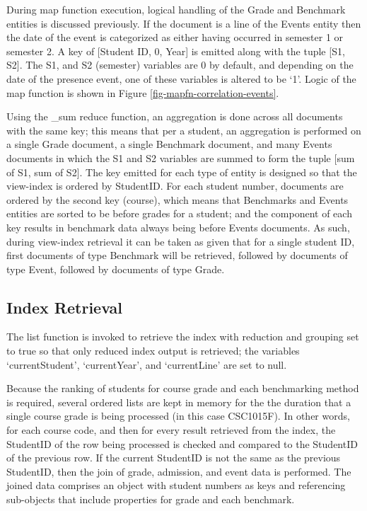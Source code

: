 During map function execution, logical handling of the Grade and Benchmark entities is discussed previously. If the document is a line of the Events entity then the date of the event is categorized as either having occurred in semester 1 or semester 2. A key of [Student ID, 0, Year] is emitted along with the tuple [S1, S2]. The S1, and S2 (semester) variables are 0 by default, and depending on the date of the presence event, one of these variables is altered to be `1'. Logic of the map function is shown in Figure \ref{fig-mapfn-correlation-events}.

Using the \_sum reduce function, an aggregation is done across all documents with the same key; this means that per a student, an aggregation is performed on a single Grade document, a single Benchmark document, and many Events documents in which the S1 and S2 variables are summed to form the tuple [sum of S1, sum of S2]. The key emitted for each type of entity is designed so that the view-index is ordered by StudentID. For each student number, documents are ordered by the second key (course), which means that Benchmarks and Events entities are sorted to be before grades for a student; and the  component of each key results in benchmark data always being before Events documents. As such, during view-index retrieval it can be taken as given that for a single student ID, first documents of type Benchmark will be retrieved, followed by documents of type Event, followed by documents of type Grade.



\subsection{Index Retrieval}
The list function is invoked to retrieve the index with reduction and grouping set to true so that only reduced index output is retrieved; the variables `currentStudent', `currentYear', and `currentLine' are set to null.

Because the ranking of students for course grade and each benchmarking method is required, several ordered lists are kept in memory for the the duration that a single course grade is being processed (in this case CSC1015F). In other words, for each course code, and then for every result retrieved from the index, the StudentID of the row being processed is checked and compared to the StudentID of the previous row. If the current StudentID is not the same as the previous StudentID, then the join of grade, admission, and event data is performed. The joined data comprises an object with student numbers as keys and referencing sub-objects that include properties for grade and each benchmark.

